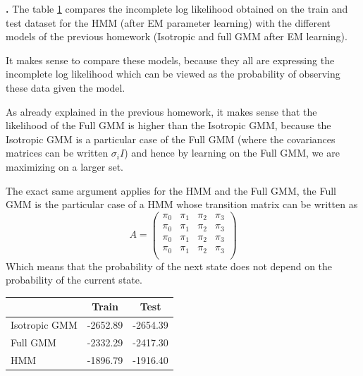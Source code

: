 \documentclass[a4paper, 11pt]{article}
\newcounter{cquestion}[subsection]
\renewcommand{\thecquestion}{\arabic{cquestion}}
\newenvironment{question}
{\par \vspace{0.5em} \noindent \stepcounter{cquestion} \hspace{-1em}
  \textbf{\thecquestion.}}
{}
\begin{document}
\begin{question}
  The table \ref{tab:likelihood-comparison} compares the incomplete
  log likelihood obtained on the train and test dataset for the HMM
  (after EM parameter learning) with the different models of the
  previous homework (Isotropic and full GMM after EM learning).

  It makes sense to compare these models, because they all are
  expressing the incomplete log likelihood which can be viewed
  as the probability of observing these data given the model.

  As already explained in the previous homework, it makes sense that
  the likelihood of the Full GMM is higher than the Isotropic GMM,
  because the Isotropic GMM is a particular case of the Full GMM
  (where the covariances matrices can be written $\sigma_i I$) and
  hence by learning on the Full GMM, we are maximizing on a larger set.

  The exact same argument applies for the HMM and the Full GMM, the
  Full GMM is the particular case of a HMM whose transition matrix can
  be written as
  \begin{equation}
    \label{eq:no-transition}\tag{$\star$}
    A =
    \begin{pmatrix}
      \pi_0 & \pi_1 & \pi_2 & \pi_3 \\
      \pi_0 & \pi_1 & \pi_2 & \pi_3 \\
      \pi_0 & \pi_1 & \pi_2 & \pi_3 \\
      \pi_0 & \pi_1 & \pi_2 & \pi_3 \\
    \end{pmatrix}
  \end{equation}
  Which means that the probability of the next state does not depend
  on the probability of the current state.

  \begin{table}[h!]
    \centering
    \begin{tabular}{|l||c|c|}
      \hline
      & \textbf{Train} & \textbf{Test} \\
      \hline
      Isotropic GMM & -2652.89 & -2654.39 \\
      \hline
      Full GMM & -2332.29 & -2417.30 \\
      \hline
      HMM & -1896.79 & -1916.40\\
      \hline
    \end{tabular}
     \label{tab:likelihood-comparison}
  \end{table}

\end{question}
\end{document}
